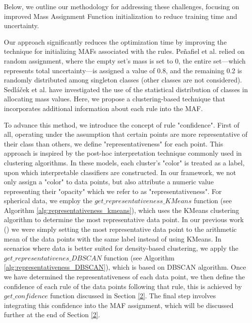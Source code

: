 \documentclass[10pt,a4paper,oneside]{article}
\begin{document}
{\color{blue}Below, we outline our methodology for addressing these challenges, focusing on improved Mass Assignment Function initialization to reduce training time and uncertainty.}

Our approach significantly reduces the optimization time by improving the technique for initializing MAFs associated with the rules. Peñafiel et al. \cite{sergio} relied on random assignment, where the empty set's mass is set to 0, the entire set—which represents total uncertainty—is assigned a value of 0.8, and the remaining 0.2 is randomly distributed among singleton classes (other classes are not considered). {\color{black} Sedláček et al. \cite{czechs} have investigated the use of the statistical distribution of classes in allocating mass values}. Here{\color{black},} we propose a {\color{black} clustering-based} technique that incorporates additional information about each rule into the MAF. 

To advance this method, we introduce the concept of rule "confidence". First of all, operating under the assumption that certain points are more representative of their class than others{\color{black},} we define "representativeness" for each point. This approach is inspired by the post-hoc interpretation technique commonly used in clustering algorithms. In these models, each cluster's "color" is treated as a label, upon which interpretable classifiers are constructed. In our framework, we not only assign a "color" to data points{\color{black},} but also attribute a numeric value representing their "opacity" which we refer to as "representativeness". For spherical data, we employ the $get\_representativeness\_KMeans$ function (see Algorithm \ref{alg:representativeness_kmeans}), which uses the KMeans clustering algorithm \cite{kmeans} to determine the most representative data point. {\color{black}In our previous work (\cite{menq}) we were simply setting the most representative data point to the arithmetic mean of the data points with the same label instead of using KMeans.} In scenarios where data is better suited for density-based clustering, we apply the $get\_representativenes\_DBSCAN$ function (see Algorithm \ref{alg:representativeness_DBSCAN}), {\color{black}which is based on DBSCAN \cite{DBSCAN} algorithm.} Once we have determined the representativeness of each data point, we then define the confidence of each rule of the data points following that rule, this is achieved by $get\_confidence$ function discussed in Section \ref{2}. The final step involves integrating this confidence into the MAF assignment, which will be discussed further at the end of Section \ref{2}.
\end{document}
